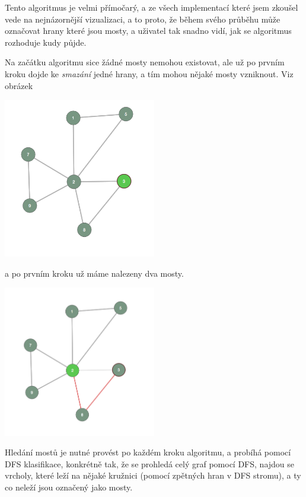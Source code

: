 \documentclass{article}
\begin{document}
Tento algoritmus je velmi přímočarý, a ze všech implementací které jsem
zkoušel vede na nejnázornější vizualizaci, a to proto, že během svého
průběhu může označovat hrany které jsou mosty, a uživatel tak snadno
vidí, jak se algoritmus rozhoduje kudy půjde.

Na začátku algoritmu sice žádné mosty nemohou existovat, ale už po
prvním kroku dojde ke \emph{smazání} jedné hrany, a tím mohou nějaké mosty
vzniknout. Viz obrázek

\begin{center}
    \includegraphics[width=0.5\textwidth]{95ubo0l.png}
\end{center}
\vspace{10pt}

a po prvním kroku už máme nalezeny dva mosty.

\vspace{10pt}
\begin{center}
    \includegraphics[width=0.5\textwidth]{Ls741t3.png}
\end{center}
\vspace{10pt}

Hledání mostů je nutné provést po každém kroku algoritmu, a probíhá
pomocí DFS klasifikace, konkrétně tak, že se prohledá celý graf pomocí
DFS, najdou se vrcholy, které leží na nějaké kružnici (pomocí zpětných
hran v DFS stromu), a ty co neleží jsou označený jako mosty.
\end{document}

